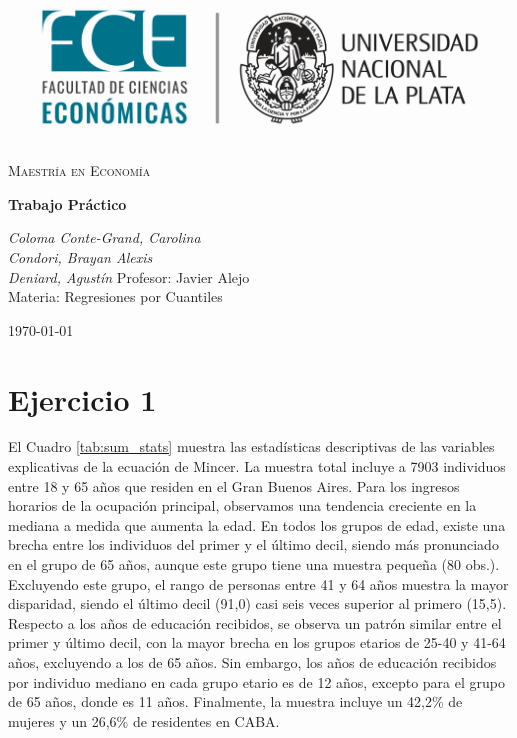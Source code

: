\documentclass[12pt]{article}
\begin{document}
   


\begin{titlepage}
    \centering
    \vspace*{2cm}
    \includegraphics[width=1\textwidth]{logo.png} 
    
    \vspace{2cm}
    {\scshape\LARGE Maestría en Economía} \\
    
    \vspace{0.5cm}
    {\huge\bfseries
    Trabajo Práctico\par}
    \vspace{2cm}
    {\LARGE\itshape Coloma Conte-Grand, Carolina} \\
    
    {\LARGE\itshape Condori, Brayan Alexis} \\
    
    {\LARGE\itshape Deniard, Agustín}
    \vfill
    {\Large Profesor: Javier Alejo} \\
    \vspace{0.5cm}
    {\Large Materia: Regresiones por Cuantiles}

    \vfill

    {\Large \today\par}
\end{titlepage}

\justify 

\section*{Ejercicio 1}


El Cuadro \ref{tab:sum_stats} muestra las estadísticas descriptivas de las variables explicativas de la ecuación de Mincer. La muestra total incluye a 7903 individuos entre 18 y 65 años que residen en el Gran Buenos Aires. Para los ingresos horarios de la ocupación principal, observamos una tendencia creciente en la mediana a medida que aumenta la edad. En todos los grupos de edad, existe una brecha entre los individuos del primer y el último decil, siendo más pronunciado en el grupo de 65 años, aunque este grupo tiene una muestra pequeña (80 obs.). Excluyendo este grupo, el rango de personas entre 41 y 64 años muestra la mayor disparidad, siendo el último decil (91,0) casi seis veces superior al primero (15,5). Respecto a los años de educación recibidos, se observa un patrón similar entre el primer y último decil, con la mayor brecha en los grupos etarios de 25-40 y 41-64 años, excluyendo a los de 65 años. Sin embargo, los años de educación recibidos por individuo mediano en cada grupo etario es de 12 años, excepto para el grupo de 65 años, donde es 11 años. Finalmente, la muestra incluye un 42,2\% de mujeres y un 26,6\% de residentes en CABA.
\end{document}
